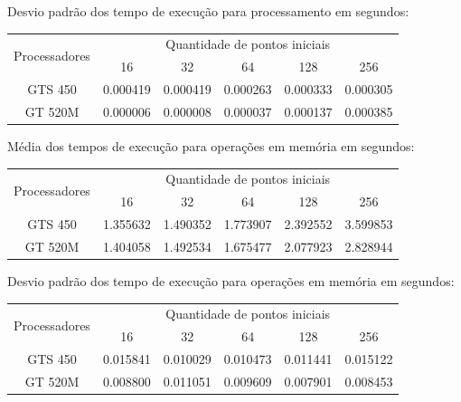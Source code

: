     \hspace{1mm}\newline
    
    \noindent Desvio padrão dos tempo de execução para processamento em segundos:\\
    \begin{scriptsize}
    \begin{tabular}{| c | c | c | c | c | c |}
      \hline
      \multirow{2}{*}{Processadores}& \multicolumn{5}{|c|}{Quantidade de pontos iniciais} \\ \cline{2-6}
      & 16 & 32 & 64 & 128 & 256 \\ \hline
      GTS 450 & 0.000419 & 0.000419 & 0.000263 & 0.000333 & 0.000305 \\ \hline
      GT 520M & 0.000006 & 0.000008 & 0.000037 & 0.000137 & 0.000385 \\ \hline

      \hline
    \end{tabular}
    \end{scriptsize}    
    \hspace{1mm}\newline
    
    \noindent Média dos tempos de execução para operações em memória em segundos:\\
    \begin{scriptsize}
    \begin{tabular}{| c | c | c | c | c | c |}
      \hline
      \multirow{2}{*}{Processadores}& \multicolumn{5}{|c|}{Quantidade de pontos iniciais} \\ \cline{2-6}
      & 16 & 32 & 64 & 128 & 256 \\ \hline
      GTS 450 & 1.355632 & 1.490352 & 1.773907 & 2.392552 & 3.599853\\ \hline
      GT 520M & 1.404058 & 1.492534 & 1.675477 & 2.077923 & 2.828944\\ \hline

      \hline
    \end{tabular}
    \end{scriptsize}
    
    \hspace{1mm}\newline
    
    \newpage
    \noindent Desvio padrão dos tempo de execução para operações em memória em segundos:\\
    \begin{scriptsize}
    \begin{tabular}{| c | c | c | c | c | c |}
      \hline
      \multirow{2}{*}{Processadores}& \multicolumn{5}{|c|}{Quantidade de pontos iniciais} \\ \cline{2-6}
      & 16 & 32 & 64 & 128 & 256 \\ \hline
      GTS 450 & 0.015841 & 0.010029 & 0.010473 & 0.011441 & 0.015122 \\ \hline
      GT 520M & 0.008800 & 0.011051 & 0.009609 & 0.007901 & 0.008453 \\ \hline

      \hline
    \end{tabular}
    \end{scriptsize}
    
